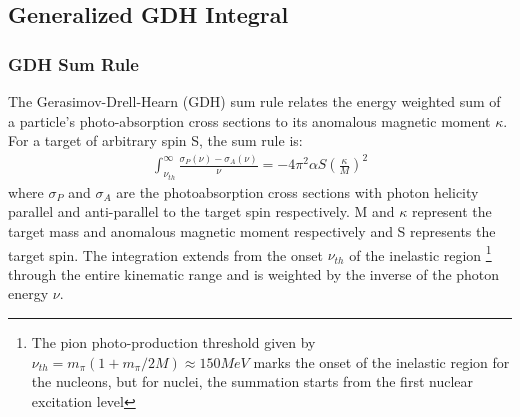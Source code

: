 \begin{comment}
\begin{figure}[h]%
  \leavevmode \texttt{[image: TexmakerMyFinTh/Chap2Theory/Figures/integralsModelsDataNoEG4Gm1LowQ2nwRange.png]} 
  \caption[Predictions for $\Gamma^d_1$ and some data]{Some theoretical predictions for $\Gamma^d_1$ and some data from past measurements. The theories and models which make these predictions are described in Sec. \ref{theoryTools}.}
  \label{modelGm1}  
\end{figure}
\end{comment}	
	
	

%
\pagebreak   %
\subsection{Generalized GDH Integral}
\subsubsection{GDH Sum Rule}
\label{gdhSmRl}
The Gerasimov-Drell-Hearn (GDH) sum rule \cite{GDHsumRule0,GDHsumRule} relates the energy weighted sum of a particle's photo-absorption cross sections to its anomalous magnetic moment $\kappa$. For a target of arbitrary spin S, the sum rule is:
\begin{eqnarray}
\label{eqGDHsmRl}
\int^{\infty}_{\nu_{th}}  \frac{\sigma_P(\nu) - \sigma_A(\nu)}{\nu} = -4 \pi^2 \alpha S(\frac{\kappa}{M})^2
\end{eqnarray}
where $\sigma_P$ and $\sigma_A$ are the photoabsorption cross sections with photon helicity parallel and anti-parallel to the target spin respectively. M and $\kappa$ represent the target mass and anomalous magnetic moment respectively and S represents the target spin. %
The integration extends from the onset $\nu_{th}$ of the inelastic region \footnote{The pion photo-production threshold given by $\nu_{th} = m_{\pi}(1+ m_{\pi}/2M) \approx 150 MeV$ marks the onset of the inelastic region for the nucleons, but for nuclei, the summation starts from the first nuclear excitation level} through the entire kinematic range and is weighted by the inverse of the photon energy $\nu$. 

